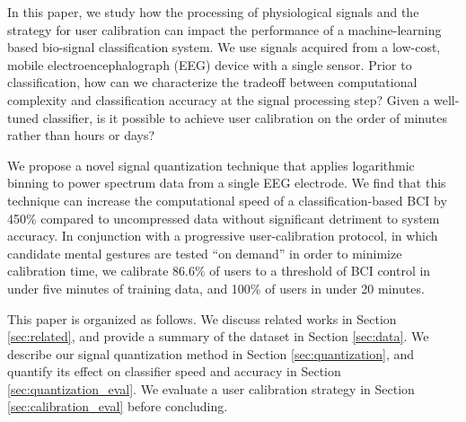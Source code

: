 
In this paper, we study how the processing of physiological signals and the strategy for user calibration can impact the performance of a machine-learning based bio-signal classification system. We use signals acquired from a low-cost, mobile electroencephalograph (EEG) device with a single sensor. Prior to classification, how can we characterize the tradeoff between computational complexity and classification accuracy at the signal processing step? Given a well-tuned classifier, is it possible to achieve user calibration on the order of minutes rather than hours or days?


We propose a novel signal quantization technique that applies logarithmic binning to power spectrum data from a single EEG electrode. We find that this technique can increase the computational speed of a classification-based BCI by 450\% compared to uncompressed data without significant detriment to system accuracy. In conjunction with a progressive user-calibration protocol, in which candidate mental gestures are tested ``on demand'' in order to minimize calibration time, we calibrate 86.6\% of users to a threshold of BCI control in under five minutes of training data, and 100\% of users in under 20 minutes. 

This paper is organized as follows. We discuss related works in Section \ref{sec:related}, and provide a summary of the dataset in Section \ref{sec:data}. We describe our signal quantization method in Section \ref{sec:quantization}, and quantify its effect on classifier speed and accuracy in Section \ref{sec:quantization_eval}. We evaluate a user calibration strategy in Section \ref{sec:calibration_eval} before concluding.
